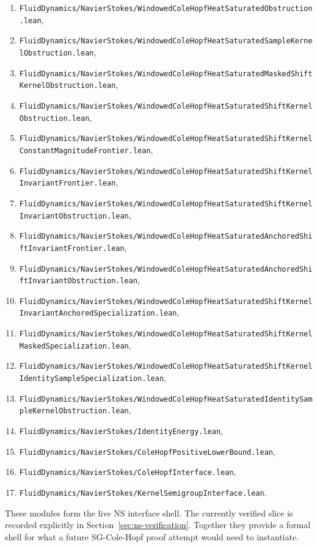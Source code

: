 \documentclass[11pt]{article}
\begin{document}
\begin{enumerate}[leftmargin=1.5em]
  \item \texttt{FluidDynamics/NavierStokes/WindowedColeHopfHeatSaturatedObstruction.lean},
  \item \texttt{FluidDynamics/NavierStokes/WindowedColeHopfHeatSaturatedSampleKernelObstruction.lean},
  \item \texttt{FluidDynamics/NavierStokes/WindowedColeHopfHeatSaturatedMaskedShiftKernelObstruction.lean},
  \item \texttt{FluidDynamics/NavierStokes/WindowedColeHopfHeatSaturatedShiftKernelObstruction.lean},
  \item \texttt{FluidDynamics/NavierStokes/WindowedColeHopfHeatSaturatedShiftKernelConstantMagnitudeFrontier.lean},
  \item \texttt{FluidDynamics/NavierStokes/WindowedColeHopfHeatSaturatedShiftKernelInvariantFrontier.lean},
  \item \texttt{FluidDynamics/NavierStokes/WindowedColeHopfHeatSaturatedShiftKernelInvariantObstruction.lean},
  \item \texttt{FluidDynamics/NavierStokes/WindowedColeHopfHeatSaturatedAnchoredShiftInvariantFrontier.lean},
  \item \texttt{FluidDynamics/NavierStokes/WindowedColeHopfHeatSaturatedAnchoredShiftInvariantObstruction.lean},
  \item \texttt{FluidDynamics/NavierStokes/WindowedColeHopfHeatSaturatedShiftKernelInvariantAnchoredSpecialization.lean},
  \item \texttt{FluidDynamics/NavierStokes/WindowedColeHopfHeatSaturatedShiftKernelMaskedSpecialization.lean},
  \item \texttt{FluidDynamics/NavierStokes/WindowedColeHopfHeatSaturatedShiftKernelIdentitySampleSpecialization.lean},
  \item \texttt{FluidDynamics/NavierStokes/WindowedColeHopfHeatSaturatedIdentitySampleKernelObstruction.lean},
  \item \texttt{FluidDynamics/NavierStokes/IdentityEnergy.lean},
  \item \texttt{FluidDynamics/NavierStokes/ColeHopfPositiveLowerBound.lean},
  \item \texttt{FluidDynamics/NavierStokes/ColeHopfInterface.lean},
  \item \texttt{FluidDynamics/NavierStokes/KernelSemigroupInterface.lean}.
\end{enumerate}

These modules form the live NS interface shell.  The currently verified slice is
recorded explicitly in Section~\ref{sec:ns-verification}.  Together they
provide a formal shell for what a future SG-Cole-Hopf proof attempt would need
to instantiate.
\end{document}
